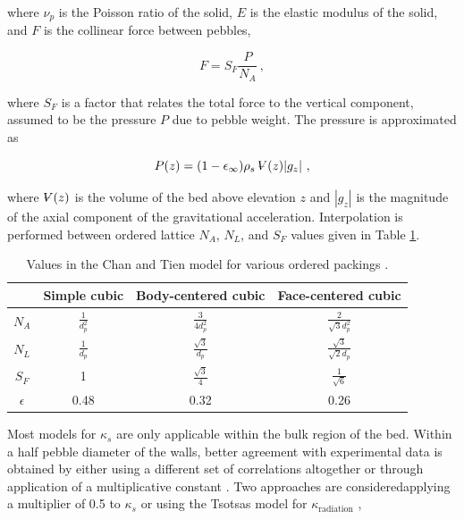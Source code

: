 \noindent where \(\nu_p\) is the Poisson ratio of the solid, \(E\) is the elastic modulus of the solid, and \(F\) is the collinear force between pebbles,

\begin{equation}
\label{eq:ContactForce}
F=S_F\frac{P}{N_A}\ ,
\end{equation}

\noindent where \(S_F\) is a factor that relates the total force to the vertical component, assumed to be the pressure \(P\) due to pebble weight. The pressure is approximated as

\begin{equation}
P(z)=(1-\epsilon_\infty)\rho_s\volume(z)|g_z|\ ,
\end{equation}

\noindent where \(\volume(z)\) is the volume of the bed above elevation \(z\) and \(|g_z|\) is the magnitude of the axial component of the gravitational acceleration. Interpolation is performed between ordered lattice \(N_A\), \(N_L\), and \(S_F\) values given in Table \ref{table:ChanTien}.

\begin{table}[!h]
\caption{Values in the Chan and Tien model for various ordered packings \cite{chan}.}
\centering
\begin{tabular}{|c| c c c|}
\hline\hline
& Simple cubic & Body-centered cubic & Face-centered cubic\Bstrut\Tstrut \\
\hline
\(N_A\) & \(\frac{1}{d_p^2}\) & \(\frac{3}{4d_p^2}\) & \(\frac{2}{\sqrt{3}d_p^2}\) \Tstrut\\
\(N_L\) & \(\frac{1}{d_p}\) & \(\frac{\sqrt{3}}{d_p}\) & \(\frac{\sqrt{3}}{\sqrt{2}d_p}\) \Tstrut\\
\(S_F\) & 1 & \(\frac{\sqrt{3}}{4}\)& \(\frac{1}{\sqrt{6}}\) \Tstrut\\
\(\epsilon\) & 0.48 & 0.32 & 0.26\Tstrut\Bstrut\\
\hline
\end{tabular}
\label{table:ChanTien}
\end{table}

Most models for \(\kappa_s\) are only applicable within the bulk region of the bed. Within a half pebble diameter of the walls, better agreement with experimental data is obtained by either using a different set of correlations altogether \cite{auwerda_2011} or through application of a multiplicative constant \cite{tecdoc1163}. Two approaches are considered\mdash applying a multiplier of 0.5 to \(\kappa_s\) or using the Tsotsas model for \(\kappa_\text{radiation}\) \cite{visser}, 

